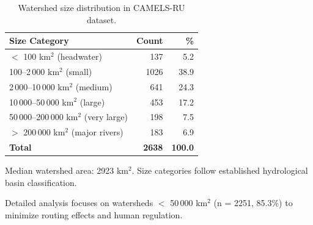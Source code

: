 \begin{table}[htbp]
\centering
\caption{Watershed size distribution in CAMELS-RU dataset.}
\label{tab:watershed_size}
\begin{tabular}{lrr}
\toprule
\textbf{Size Category} & \textbf{Count} & \textbf{\%} \\
\midrule
$<$ 100 km$^2$ (headwater) & 137 & 5.2 \\
100--2\,000 km$^2$ (small) & 1026 & 38.9 \\
2\,000--10\,000 km$^2$ (medium) & 641 & 24.3 \\
10\,000--50\,000 km$^2$ (large) & 453 & 17.2 \\
50\,000--200\,000 km$^2$ (very large) & 198 & 7.5 \\
$>$ 200\,000 km$^2$ (major rivers) & 183 & 6.9 \\
\midrule
\textbf{Total} & \textbf{2638} & \textbf{100.0} \\
\bottomrule
\end{tabular}
\begin{tablenotes}
\small
\item Median watershed area: 2923 km$^2$. Size categories follow established hydrological basin classification.
\item Detailed analysis focuses on watersheds $<$ 50\,000 km$^2$ (n = 2251, 85.3\%) to minimize routing effects and human regulation.
\end{tablenotes}
\end{table}
